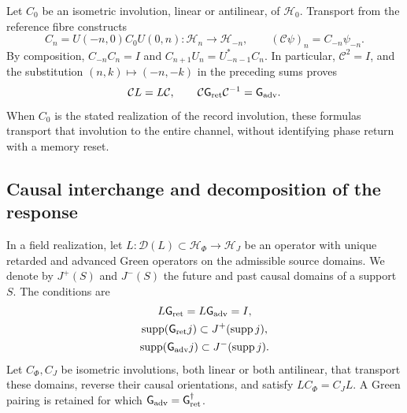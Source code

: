 Let \(C_0\) be an isometric involution, linear or antilinear, of
\(\mathcal H_0\). Transport from the reference fibre constructs
\[
 C_n=U(-n,0)C_0U(0,n):\mathcal H_n\longrightarrow\mathcal H_{-n},
 \qquad (\mathcal C\psi)_n=C_{-n}\psi_{-n}.
\]
By composition, \(C_{-n}C_n=I\) and
\(C_{n+1}U_n=U_{-n-1}^*C_n\).
In particular, \(\mathcal C^2=I\), and the substitution
\((n,k)\mapsto(-n,-k)\) in the preceding sums proves
\begin{equation}
 \mathcal C L=L\mathcal C,\qquad
 \mathcal C \mathsf{G}_{\rm ret}\mathcal C^{-1}=\mathsf{G}_{\rm adv}.
 \label{vii:eq:intercambio-green-cronologico}
\end{equation}
When \(C_0\) is the stated realization of the record involution,
these formulas transport that involution to the entire channel, without
identifying phase return with a memory reset.

\subsection{Causal interchange and decomposition of the response}
\label{vii:subsec:green-realizacion-campos}

In a field realization, let
\(L:\mathcal D(L)\subset\mathcal H_\Phi\to\mathcal H_J\)
be an operator with unique retarded and advanced Green operators on the
admissible source domains. We denote by \(J^+(S)\) and \(J^-(S)\) the
future and past causal domains of a support \(S\). The conditions are
\[
 \begin{gathered}
 L\mathsf{G}_{\rm ret}=L\mathsf{G}_{\rm adv}=I,\\
 \operatorname{supp}(\mathsf{G}_{\rm ret}j)\subset J^+(\operatorname{supp}j),\\
 \operatorname{supp}(\mathsf{G}_{\rm adv}j)\subset J^-(\operatorname{supp}j).
 \end{gathered}
\]
Let \(C_\Phi,C_J\) be isometric involutions, both linear or both
antilinear, that transport these domains, reverse their causal orientations,
and satisfy \(LC_\Phi=C_JL\). A Green pairing is retained for which
\(\mathsf{G}_{\rm adv}=\mathsf{G}_{\rm ret}^{\dagger}\).

